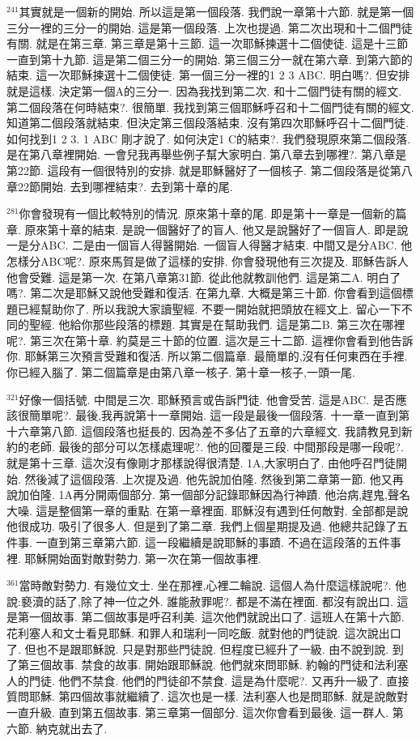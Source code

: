 \documentclass{book}
\begin{document}
$^{241}$其實就是一個新的開始.
所以這是第一個段落.
我們說一章第十六節.
就是第一個三分一裡的三分一的開始.
這是第一個段落.
上次也提過.
第二次出現和十二個門徒有關.
就是在第三章.
第三章是第十三節.
這一次耶穌揀選十二個使徒.
這是十三節一直到第十九節.
這是第二個三分一的開始.
第三個三分一就在第六章.
到第六節的結束.
這一次耶穌揀選十二個使徒.
第一個三分一裡的1 2 3 ABC.
明白嗎?.
但安排就是這樣.
決定第一個A的三分一.
因為我找到第二次.
和十二個門徒有關的經文.
第二個段落在何時結束?.
很簡單.
我找到第三個耶穌呼召和十二個門徒有關的經文.
知道第二個段落就結束.
但決定第三個段落結束.
沒有第四次耶穌呼召十二個門徒.
如何找到1 2 3.
1 ABC 剛才說了.
如何決定1 C的結束?.
我們發現原來第二個段落.
是在第八章裡開始.
一會兒我再舉些例子幫大家明白.
第八章去到哪裡?.
第八章是第22節.
這段有一個很特別的安排.
就是耶穌醫好了一個核子.
第二個段落是從第八章22節開始.
去到哪裡結束?.
去到第十章的尾.

$^{281}$你會發現有一個比較特別的情況.
原來第十章的尾.
即是第十一章是一個新的篇章.
原來第十章的結束.
是說一個醫好了的盲人.
他又是說醫好了一個盲人.
即是說一是分ABC.
二是由一個盲人得醫開始.
一個盲人得醫才結束.
中間又是分ABC.
他怎樣分ABC呢?.
原來馬賀是做了這樣的安排.
你會發現他有三次提及.
耶穌告訴人他會受難.
這是第一次.
在第八章第31節.
從此他就教訓他們.
這是第二A.
明白了嗎?.
第二次是耶穌又說他受難和復活.
在第九章.
大概是第三十節.
你會看到這個標題已經幫助你了.
所以我說大家讀聖經.
不要一開始就把頭放在經文上.
留心一下不同的聖經.
他給你那些段落的標題.
其實是在幫助我們.
這是第二B.
第三次在哪裡呢?.
第三次在第十章.
約莫是三十節的位置.
這次是三十二節.
這裡你會看到他告訴你.
耶穌第三次預言受難和復活.
所以第二個篇章.
最簡單的,沒有任何東西在手裡.
你已經入腦了.
第二個篇章是由第八章一核子.
第十章一核子,一頭一尾.

$^{321}$好像一個括號.
中間是三次.
耶穌預言或告訴門徒.
他會受苦.
這是ABC.
是否應該很簡單呢?.
最後,我再說第十一章開始.
這一段是最後一個段落.
十一章一直到第十六章第八節.
這個段落也挺長的.
因為差不多佔了五章的六章經文.
我請教見到新約的老師.
最後的部分可以怎樣處理呢?.
他的回覆是三段.
中間那段是哪一段呢?.
就是第十三章.
這次沒有像剛才那樣說得很清楚.
1A,大家明白了.
由他呼召門徒開始.
然後減了這個段落.
上次提及過.
他先說加伯隆.
然後到第二章第一節.
他又再說加伯隆.
1A再分開兩個部分.
第一個部分記錄耶穌因為行神蹟.
他治病,趕鬼,聲名大噪.
這是整個第一章的重點.
在第一章裡面.
耶穌沒有遇到任何敵對.
全部都是說他很成功.
吸引了很多人.
但是到了第二章.
我們上個星期提及過.
他總共記錄了五件事.
一直到第三章第六節.
這一段繼續是說耶穌的事蹟.
不過在這段落的五件事裡.
耶穌開始面對敵對勢力.
第一次在第一個故事裡.

$^{361}$當時敵對勢力.
有幾位文士.
坐在那裡,心裡二輪說.
這個人為什麼這樣說呢?.
他說:褻瀆的話了,除了神一位之外.
誰能赦罪呢?.
都是不滿在裡面.
都沒有說出口.
這是第一個故事.
第二個故事是呼召利美.
這次他們就說出口了.
這班人在第十六節.
花利塞人和文士看見耶穌.
和罪人和瑞利一同吃飯.
就對他的門徒說.
這次說出口了.
但也不是跟耶穌說.
只是對那些門徒說.
但程度已經升了一級.
由不說到說.
到了第三個故事.
禁食的故事.
開始跟耶穌說.
他們就來問耶穌.
約翰的門徒和法利塞人的門徒.
他們不禁食.
他們的門徒卻不禁食.
這是為什麼呢?.
又再升一級了.
直接質問耶穌.
第四個故事就繼續了.
這次也是一樣.
法利塞人也是問耶穌.
就是說敵對一直升級.
直到第五個故事.
第三章第一個部分.
這次你會看到最後.
這一群人.
第六節.
納克就出去了.
\end{document}
